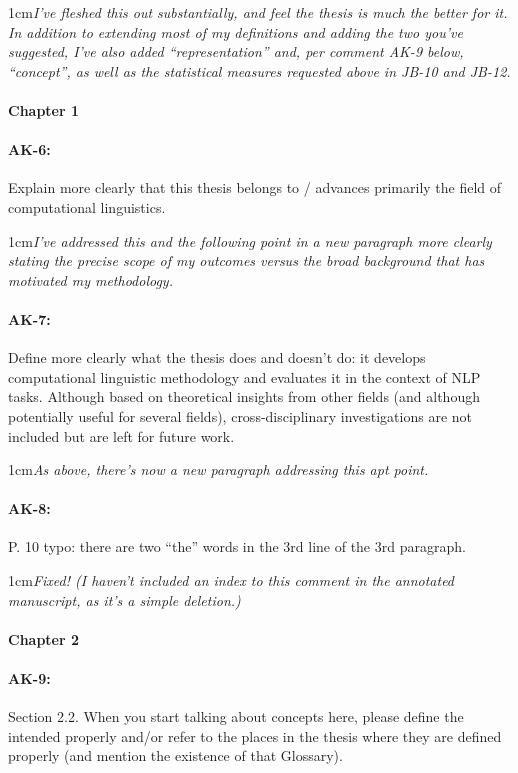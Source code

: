 \documentclass[11pt,a4paper]{article}
\newcommand{\res}[1]{\vspace{0.25cm} \begin{adjustwidth}{1cm}{}\emph{#1}\end{adjustwidth}}
\begin{document}
\res{I've fleshed this out substantially, and feel the thesis is much the better for it.  In addition to extending most of my definitions and adding the two you've suggested, I've also added ``representation'' and, per comment AK-9 below, ``concept'', as well as the statistical measures requested above in JB-10 and JB-12.}

\paragraph{Chapter 1}

\paragraph{AK-6:} Explain more clearly that this thesis belongs to / advances primarily the field of computational linguistics.

\res{I've addressed this and the following point in a new paragraph more clearly stating the precise scope of my outcomes versus the broad background that has motivated my methodology.}

\paragraph{AK-7:} Define more clearly what the thesis does and doesn’t do: it develops computational linguistic methodology and evaluates it in the context of NLP tasks. Although based on theoretical insights from other fields (and although potentially useful for several fields), cross-disciplinary investigations are not included but are left for future work.

\res{As above, there's now a new paragraph addressing this apt point.}

\paragraph{AK-8:} P. 10 typo: there are two “the” words in the 3rd line of the 3rd paragraph.

\res{Fixed!  (I haven't included an index to this comment in the annotated manuscript, as it's a simple deletion.)}

\paragraph{Chapter 2}

\paragraph{AK-9:} Section 2.2. When you start talking about concepts here, please define the intended properly and/or refer to the places in the thesis where they are defined properly (and mention the existence of that Glossary).
\end{document}
